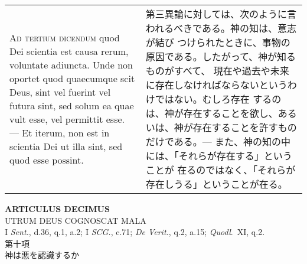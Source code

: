 \documentclass[10pt]{jsarticle} %
\begin{document}
\begin{longtable}{p{21em}p{21em}}
\\



{\scshape Ad tertium dicendum} quod Dei scientia est causa rerum,
voluntate adiuncta. Unde non oportet quod quaecumque scit Deus, sint
vel fuerint vel futura sint, sed solum ea quae vult esse, vel
permittit esse. --- Et iterum, non est in scientia Dei ut illa sint,
sed quod esse possint.


&


第三異論に対しては、次のように言われるべきである。神の知は、意志が結び
つけられたときに、事物の原因である。したがって、神が知るものがすべて、
現在や過去や未来に存在しなければならないというわけではない。むしろ存在
するのは、神が存在することを欲し、あるいは、神が存在することを許すもの
だけである。--- また、神の知の中には、「それらが存在する」ということが
在るのではなく、「それらが存在しうる」ということが在る。

\end{longtable}
\newpage



\begin{center}
{\Large {\bf ARTICULUS DECIMUS}}\\ {\large UTRUM DEUS COGNOSCAT
MALA}\\ {\footnotesize I {\itshape Sent.}, d.36, q.1, a.2; I
{\itshape SCG.}, c.71; {\itshape De Verit.}, q.2, a.15; {\itshape
Quodl}.~XI, q.2.}\\ {\Large 第十項\\神は悪を認識するか}
\end{center}
\end{document}
